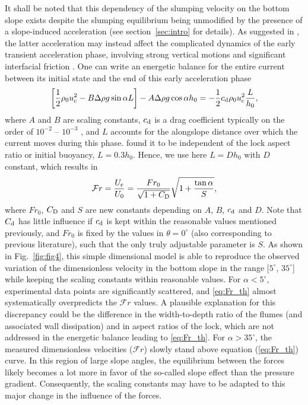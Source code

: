 \documentclass[12pt]{article}
\begin{document}
It shall be noted that this dependency of the slumping velocity on the bottom slope exists despite the slumping equilibrium being unmodified by the presence of a slope-induced acceleration (see section~\ref{sec:intro} for details). As suggested in \citet{Gadal2023}, the latter acceleration may instead affect the complicated dynamics of the early transient acceleration phase, involving strong vertical motions and significant interfacial friction \citep{Cantero2007}.
%
One can write an energetic balance for the entire current between its initial state and the end of this early acceleration phase \citep{Gadal2023}
\begin{equation}
	\label{eq:energetic_balance}
	\left[\frac{1}{2}\rho_{0}u_{\text c}^{2} - B \Delta\rho g \sin\alpha L\right] - A \Delta\rho g \cos\alpha h_{0} =  - \frac{1}{2}c_{\text d}\rho_{0}u_{\text c}^{2} \frac{L}{h_{0}},
\end{equation}
where $A$ and $B$ are scaling constants, $c_{\text d}$ is a drag coefficient typically on the order of $10^{-2}$ -- $10^{-3}$ \citep{hogg2004effects}, and $L$ accounts for the alongslope distance over which the current moves during this phase. \citet{Cantero2007} found it to be independent of the lock aspect ratio or initial buoyancy, $L = 0.3 h_{0}$. Hence, we use here $L = D h_{0}$ with $D$ constant, which results in
\begin{equation}
	\label{eq:Fr_th}
	\mathcal{F}r = \frac{U_{\text c}}{U_0} = \frac{Fr_0}{\sqrt{1 + C_{\text D}}} \sqrt{1 + \frac{\tan\alpha}{S}},
\end{equation}
where $Fr_0$, $C_{\text D}$ and $S$ are new constants depending on $A$, $B$, $c_{\text d}$ and $D$. Note that $C_{\rm d}$ has little influence if $c_{\text d}$ is kept within the reasonable values mentioned previously, and $Fr_0$ is fixed by the values in $\theta = 0^\circ$ (also corresponding to previous literature), such that the only truly adjustable parameter is $S$. As shown in Fig.~\ref{fig:fig4}, this simple dimensional model is able to reproduce the observed variation of the dimensionless velocity in the bottom slope in the range [$5^\circ$, $35^\circ$] while keeping the scaling constants within reasonable values.
%
For $\alpha < 5^\circ$, experimental data points are significantly scattered, and \eqref{eq:Fr_th} almost systematically overpredicts the $\mathcal{F}r$ values. A plausible explanation for this discrepancy could be the difference in the width-to-depth ratio of the flumes (and associated wall dissipation) and in aspect ratios of the lock, which are not addressed in the energetic balance leading to \eqref{eq:Fr_th}.
%
For $\alpha > 35^\circ$, the measured dimensionless velocities ($\mathcal{F}r$) slowly stand above equation (\ref{eq:Fr_th}) curve. In this region of large slope angles, the equilibrium between the forces likely becomes a lot more in favor of the so-called slope effect than the pressure gradient. Consequently, the scaling constants may have to be adapted to this major change in the influence of the forces.
\end{document}
